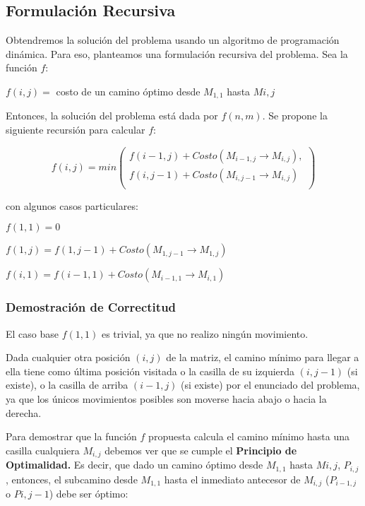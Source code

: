 \subsection{Formulación Recursiva}

Obtendremos la solución del problema usando un algoritmo de programación dinámica. Para eso, planteamos una formulación recursiva del problema. Sea la función $f$:

$f(i,j) = $ costo de un camino óptimo desde $ M_{1,1} $ hasta $ M{i,j}$

Entonces, la solución del problema está dada por $f(n,m)$. 
Se propone la siguiente recursión para calcular $f$:

\begin{equation} \label{formulacionRecursiva}
f(i,j) = min \left( 
	\begin{array}{lr}
    f(i-1, j) + Costo(M_{i-1,j} \rightarrow M_{i,j}), \\
	f(i,j-1) + Costo(M_{i,j-1} \rightarrow M_{i,j}) \\
     \end{array}
   \right)
\end{equation}  

con algunos casos particulares:

$f(1,1) = 0 $

$f(1,j) = f(1,j-1) + Costo(M_{1,j-1} \rightarrow M_{1,j})$

$f(i,1) = f(i-1,1) + Costo(M_{i-1,1} \rightarrow M_{i,1})$

\subsubsection{Demostración de Correctitud}

El caso base $f(1,1)$ es trivial, ya que no realizo ningún movimiento.

Dada cualquier otra posición $(i,j)$ de la matriz, el camino mínimo para llegar a ella tiene como última posición visitada o la casilla de su izquierda $(i, j-1)$ (si existe), o la casilla de arriba $(i-1, j)$ (si existe) por el enunciado del problema, ya que los únicos movimientos posibles son moverse hacia abajo o hacia la derecha.

Para demostrar que la función $f$ propuesta calcula el camino mínimo hasta una casilla cualquiera $M_{i,j}$ debemos ver que se cumple el \textbf{Principio de Optimalidad.} Es decir, que dado un camino óptimo desde $M_{1,1}$ hasta $M{i,j}$, $P_{i,j}$, entonces, el subcamino desde $M_{1,1}$ hasta el inmediato antecesor de $M_{i,j}$ ($P_{i-1,j}$ o $P{i,j-1}$) debe ser óptimo: 

